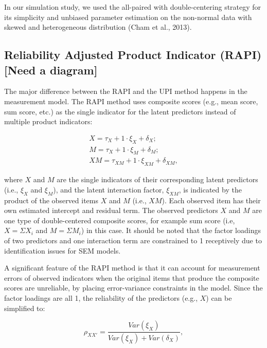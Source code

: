 \documentclass[
  man]{apa7}
\begin{document}
In our simulation study, we used the all-paired with double-centering strategy for its simplicity and unbiased parameter estimation on the non-normal data with skewed and heterogeneous distribution (Cham et al., 2013).

\hypertarget{reliability-adjusted-product-indicator-rapi-need-a-diagram}{%
\subsection{Reliability Adjusted Product Indicator (RAPI) {[}Need a diagram{]}}\label{reliability-adjusted-product-indicator-rapi-need-a-diagram}}

The major difference between the RAPI and the UPI method happens in the measurement model. The RAPI method uses composite scores (e.g., mean score, sum score, etc.) as the single indicator for the latent predictors instead of multiple product indicators:

\begin{equation}
\begin{gathered}
  X = \tau_{X} + 1\cdot\xi_{X} + \delta_{X};\\
  M = \tau_{X} + 1\cdot\xi_{M} + \delta_{M};\\
  XM = \tau_{XM} + 1\cdot\xi_{XM} + \delta_{XM},
\end{gathered}
\end{equation}

where \(X\) and \(M\) are the single indicators of their corresponding latent predictors (i.e., \(\xi_{X}\) and \(\xi_{M}\)), and the latent interaction factor, \(\xi_{XM}\), is indicated by the product of the observed items \(X\) and \(M\) (i.e., \(XM\)). Each observed item has their own estimated intercept and residual term. The observed predictors \(X\) and \(M\) are one type of double-centered composite scores, for example sum score (i.e, \(X = \Sigma{X_{i}}\) and \(M = \Sigma{M_{i}}\)) in this case. It should be noted that the factor loadings of two predictors and one interaction term are constrained to 1 receptively due to identification issues for SEM models.

A significant feature of the RAPI method is that it can account for measurement errors of observed indicators when the original items that produce the composite scores are unreliable, by placing error-variance constraints in the model. Since the factor loadings are all 1, the reliability of the predictors (e.g., \(X\)) can be simplified to:

\begin{equation}
\rho_{XX'} = \frac{Var(\xi_{X})}{Var(\xi_{X}) + Var(\delta_{X})},
\end{equation}
\end{document}
